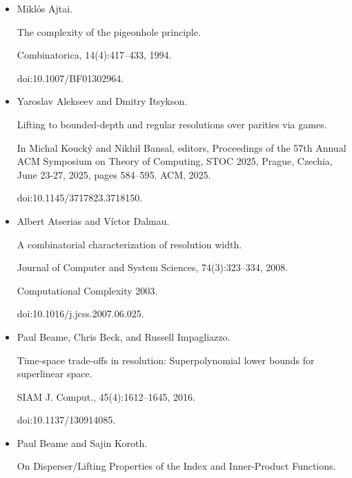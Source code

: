 \documentclass[10pt,a4paper]{article}
\begin{document}
\begin{itemize}


\item 
[1]

Miklós Ajtai.


The complexity of the pigeonhole principle.


Combinatorica, 14(4):417–433, 1994.


doi:10.1007/BF01302964.





\item 
[2]

Yaroslav Alekseev and Dmitry Itsykson.


Lifting to bounded-depth and regular resolutions over parities via
games.


In Michal Koucký and Nikhil Bansal, editors, Proceedings
of the 57th Annual ACM Symposium on Theory of Computing, STOC 2025,
Prague, Czechia, June 23-27, 2025, pages 584–595. ACM, 2025.


doi:10.1145/3717823.3718150.





\item 
[3]

Albert Atserias and Víctor Dalmau.


A combinatorial characterization of resolution width.


Journal of Computer and System Sciences, 74(3):323–334, 2008.


Computational Complexity 2003.


doi:10.1016/j.jcss.2007.06.025.





\item 
[4]

Paul Beame, Chris Beck, and Russell Impagliazzo.


Time-space trade-offs in resolution: Superpolynomial lower bounds for
superlinear space.


SIAM J. Comput., 45(4):1612–1645, 2016.


doi:10.1137/130914085.





\item 
[5]

Paul Beame and Sajin Koroth.


On Disperser/Lifting Properties of the Index and Inner-Product
Functions.



\end{itemize}
\end{document}
